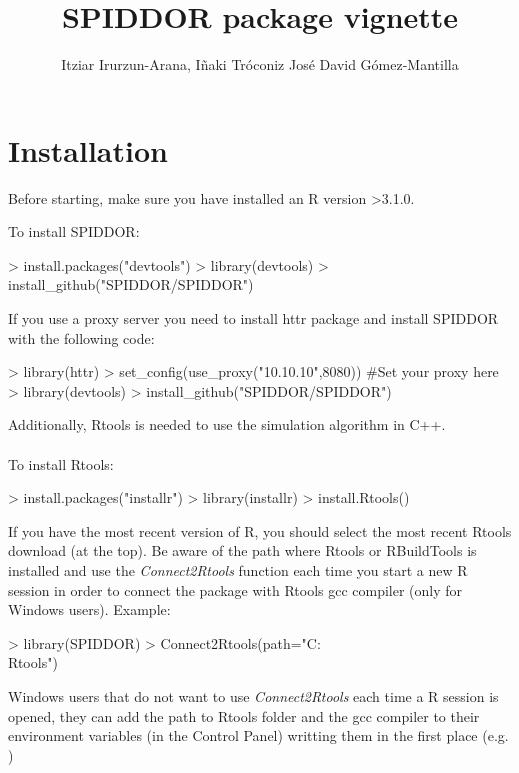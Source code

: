 \documentclass[a4paper]{article}
\title{SPIDDOR package vignette}
\author{Itziar Irurzun-Arana, I\~naki Tr\'oconiz Jos\'e David G\'omez-Mantilla}
\begin{document}


\maketitle
\tableofcontents
\clearpage

\section{Installation}
Before starting, make sure you have installed an R version >3.1.0. 

To install SPIDDOR:
\begin{Schunk}
\begin{Sinput}
> install.packages("devtools")
> library(devtools)
> install_github("SPIDDOR/SPIDDOR")
\end{Sinput}
\end{Schunk}
If you use a proxy server you need to install httr package and install SPIDDOR with the following code:
\begin{Schunk}
\begin{Sinput}
> library(httr)
> set_config(use_proxy("10.10.10",8080)) #Set your proxy here
> library(devtools)
> install_github("SPIDDOR/SPIDDOR") 
\end{Sinput}
\end{Schunk}

Additionally, Rtools is needed to use the simulation algorithm in C++.\\
\\
To install Rtools:
\begin{Schunk}
\begin{Sinput}
> install.packages("installr")
> library(installr)
> install.Rtools() 
\end{Sinput}
\end{Schunk}
If you have the most recent version of R, you should select the most recent Rtools download (at the top).
Be aware of the path where Rtools or RBuildTools is installed and use the \emph{Connect2Rtools} function each time you start a new R session in order to connect the package with Rtools gcc compiler (only for Windows users). Example:
\begin{Schunk}
\begin{Sinput}
> library(SPIDDOR)
> Connect2Rtools(path="C:\\Rtools")
\end{Sinput}
\end{Schunk}

Windows users that do not want to use \emph{Connect2Rtools} each time a R session is opened, they can add the path to Rtools folder and the gcc compiler to their environment variables (in the Control Panel) writting them in the first place (e.g. )
\end{document}
